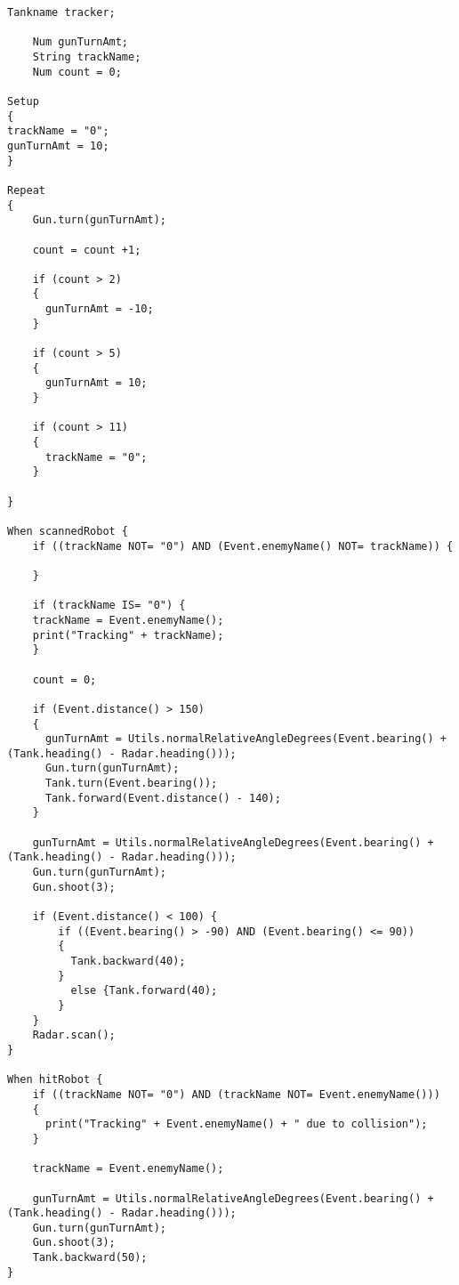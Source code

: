 \begin{lstlisting}[caption={The robot Tracker written in our language}, label={lst:tracker}]
Tankname tracker;

    Num gunTurnAmt;
    String trackName;
    Num count = 0;

Setup
{
trackName = "0";
gunTurnAmt = 10;
}

Repeat
{
    Gun.turn(gunTurnAmt);

    count = count +1;

    if (count > 2)
    {
      gunTurnAmt = -10;
    }

    if (count > 5)
    {
      gunTurnAmt = 10;
    }

    if (count > 11)
    {
      trackName = "0";
    }

}

When scannedRobot {
    if ((trackName NOT= "0") AND (Event.enemyName() NOT= trackName)) {

    }

    if (trackName IS= "0") {
    trackName = Event.enemyName();
    print("Tracking" + trackName);
    }

    count = 0;

    if (Event.distance() > 150)
    {
      gunTurnAmt = Utils.normalRelativeAngleDegrees(Event.bearing() + (Tank.heading() - Radar.heading()));
      Gun.turn(gunTurnAmt);
      Tank.turn(Event.bearing());
      Tank.forward(Event.distance() - 140);
    }

    gunTurnAmt = Utils.normalRelativeAngleDegrees(Event.bearing() + (Tank.heading() - Radar.heading()));
    Gun.turn(gunTurnAmt);
    Gun.shoot(3);

    if (Event.distance() < 100) {
        if ((Event.bearing() > -90) AND (Event.bearing() <= 90))
        {
          Tank.backward(40);
        }
          else {Tank.forward(40);
        }
    }
    Radar.scan();
}

When hitRobot {
    if ((trackName NOT= "0") AND (trackName NOT= Event.enemyName()))
    {
      print("Tracking" + Event.enemyName() + " due to collision");
    }

    trackName = Event.enemyName();

    gunTurnAmt = Utils.normalRelativeAngleDegrees(Event.bearing() + (Tank.heading() - Radar.heading()));
    Gun.turn(gunTurnAmt);
    Gun.shoot(3);
    Tank.backward(50);
}
\end{lstlisting}

